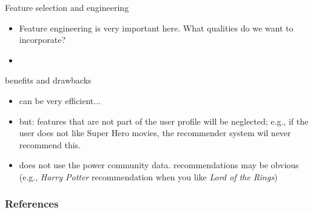 \documentclass[compress]{beamer}
\begin{document}
\begin{frame}
\begin{block}{Feature selection and engineering}
\begin{itemize}
	\item Feature engineering is very important here. What qualities do we want to incorporate?
	\pause
	\item 
	\pause
\end{itemize}
\end{block}
\end{frame}


\begin{frame}
\begin{block}{benefits and drawbacks}
\begin{itemize}
	\item can be very efficient...
	\item but: features that are not part of the user profile will be neglected; e.g., if the user does not like Super Hero movies, the recommender system wil never recommend this. 
	\item does not use the power community data. recommendations may be obvious (e.g., \textit{Harry Potter} recommendation when you like \textit{Lord of the Rings})
\end{itemize}
\end{block}
\end{frame}


\begin{frame}
	\frametitle{References}
	\printbibliography
\end{frame}
	
\end{document}
